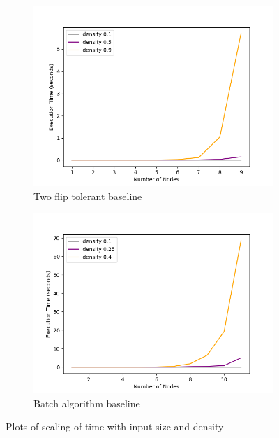 \documentclass[sigplan,review,nonacm=true]{acmart}
\begin{document}
\begin{figure}\ContinuedFloat

    \begin{subfigure}{\linewidth}
      \includegraphics[width=\linewidth]{timeVsSize_10_TwoFlipPathChecker.png}
      \caption{Two flip tolerant baseline}
      \label{fig:sfigTwoFlipTvsS}
    \end{subfigure}

    \begin{subfigure}{\linewidth}
      \includegraphics[width=\linewidth]{timeVsSize_10_BatchChecker.png}
      \caption{Batch algorithm baseline}
      \label{fig:sfigBatchTvsS}
    \end{subfigure}
    \caption{Plots of scaling of time with input size and density}
    \label{fig:timeVsSize}
\end{figure}
\end{document}
